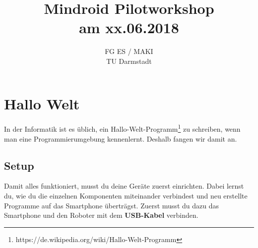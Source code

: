 \documentclass[
	12pt,
	article,
	type=bsc, %
	colorbacktitle,
	instlogo,
	accentcolor=tud1c,
	german,
	twoside
]{tudexercise}
\begin{document}
  \author{}
	
\title{Mindroid Pilotworkshop \\ am xx.06.2018}
	
\subtitle{FG ES / MAKI \\ TU Darmstadt}
\subsubtitle{}
	
\maketitle
	
\newpage
	
\tableofcontents 

\newpage
	
	
	
	\section{Hallo Welt}
	In der Informatik ist es üblich, ein Hallo-Welt-Programm\footnote{https://de.wikipedia.org/wiki/Hallo-Welt-Programm} zu schreiben, wenn man eine Programmierumgebung kennenlernt. Deshalb fangen wir damit an. 
	
\subsection{Setup}
Damit alles funktioniert, musst du deine Geräte zuerst einrichten. Dabei lernst du, wie du die einzelnen Komponenten miteinander verbindest und neu erstellte Programme auf das Smartphone überträgst.
Zuerst musst du dazu das Smartphone und den Roboter mit dem \textbf{USB-Kabel} verbinden.
\end{document}
